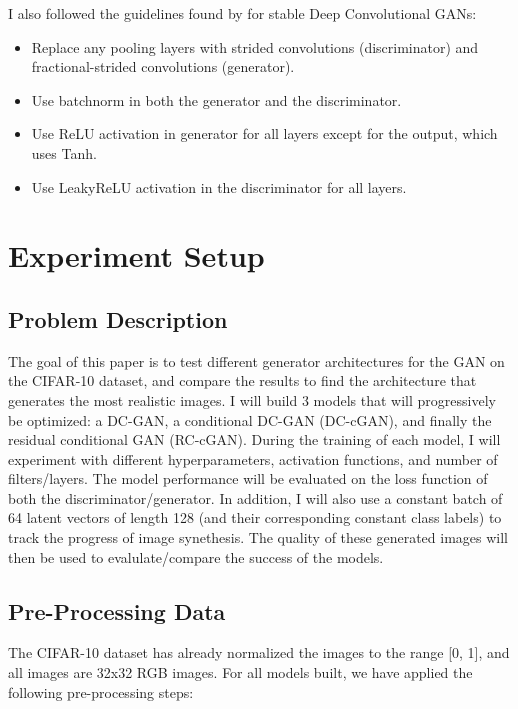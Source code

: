 \documentclass[twoside,11pt]{article}
\begin{document}
\noindent I also followed the guidelines found by \citet{radford:16} for stable Deep Convolutional GANs:

\begin{itemize}
  \item Replace any pooling layers with strided convolutions (discriminator) and fractional-strided convolutions (generator).
  \item Use batchnorm in both the generator and the discriminator.
  \item Use ReLU activation in generator for all layers except for the output, which uses Tanh.
  \item Use LeakyReLU activation in the discriminator for all layers.
\end{itemize}

\newpage

\section{Experiment Setup}

\subsection{Problem Description}

The goal of this paper is to test different generator architectures for the GAN on the CIFAR-10 dataset, and compare the results to find the architecture that generates the most realistic images. I will build 3 models that will progressively be optimized: a DC-GAN, a conditional DC-GAN (DC-cGAN), and finally the residual conditional GAN (RC-cGAN). During the training of each model, I will experiment with different hyperparameters, activation functions, and number of filters/layers. The model performance will be evaluated on the loss function of both the discriminator/generator. In addition, I will also use a constant batch of 64 latent vectors of length 128 (and their corresponding constant class labels) to track the progress of image synethesis. The quality of these generated images will then be used to evalulate/compare the success of the models.

\subsection{Pre-Processing Data}

The CIFAR-10 dataset has already normalized the images to the range [0, 1], and all images are 32x32 RGB images. For all models built, we have applied the following pre-processing steps: 
\end{document}
